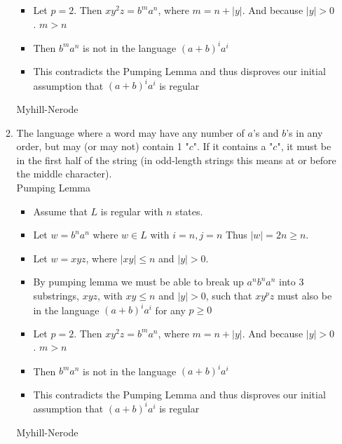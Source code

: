 \begin{enumerate}
\begin{enumerate}
\begin{itemize}
	\item Let $p = 2$. Then $xy^2z = b^ma^n$, where $m = n + |y|$.  And because $|y| > 0$. $m>n$
	
	\item Then $b^ma^n$ is not in the language $(a + b)^ia^i$
	
	\item This contradicts the Pumping Lemma and thus disproves our initial assumption that $(a + b)^ia^i$ is regular
	
\end{itemize}
Myhill-Nerode\\
	
	\item The language where a word may have any number of $a$'s and $b$'s in any order, but may (or may not) contain 1 "$c$". If it contains a "$c$", it must be in the first half of the string (in odd-length strings this means at or before the middle character).
	\\Pumping Lemma
\begin{itemize}
	\item 	Assume that $L$ is regular with $n$ states.  	
	\item Let $w = b^na^n$ where $w \in L$ with $i=n, j=n$ Thus $|w| = 2n  \geq n$.
	
	\item Let $w = xyz$, where $|xy| \leq n$ and $|y| > 0$.
	
	\item By pumping lemma we must be able to break up $a^nb^na^n$ into 3 substrings, $xyz$, with $xy \leq n$ and $|y| > 0$, such that $xy^pz$ must also be in the language $(a + b)^ia^i$ for any $p \geq 0$
	
	\item Let $p = 2$. Then $xy^2z = b^ma^n$, where $m = n + |y|$.  And because $|y| > 0$. $m>n$
	
	\item Then $b^ma^n$ is not in the language $(a + b)^ia^i$
	
	\item This contradicts the Pumping Lemma and thus disproves our initial assumption that $(a + b)^ia^i$ is regular
	
\end{itemize}
Myhill-Nerode\\
\end{enumerate}



\end{enumerate}
